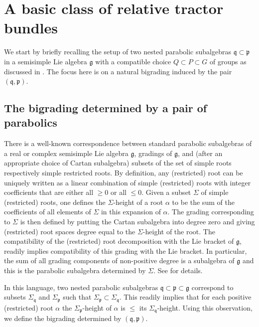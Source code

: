 \documentclass[10pt,a4paper]{amsart}
\numberwithin{equation}{section}
\def\frak{\mathfrak}
\newcommand{\al}{\alpha}
\newcommand{\Si}{\Sigma}
\begin{document}
\section{A basic class of relative tractor bundles}\label{2}

We start by briefly recalling the setup of two nested parabolic subalgebras $\frak
q\subset\frak p$ in a semisimple Lie algebra $\frak g$ with a compatible choice
$Q\subset P\subset G$ of groups as discussed in \cite{Rel-BGG1}. The focus here is on
a natural bigrading induced by the pair $(\frak q,\frak p)$.

\subsection{The bigrading determined by a pair of parabolics}\label{2.1}
There is a well-known correspondence between standard parabolic subalgebras of a real
or complex semisimple Lie algebra $\frak g$, gradings of $\frak g$, and (after an
appropriate choice of Cartan subalgebra) subsets of the set of simple roots
respectively simple restricted roots. By definition, any (restricted) root can be
uniquely written as a linear combination of simple (restricted) roots with integer
coefficients that are either all $\geq 0$ or all $\leq 0$. Given a subset $\Si$ of
simple (restricted) roots, one defines the $\Si$-height of a root $\al$ to be the sum
of the coefficients of all elements of $\Si$ in this expansion of $\al$. The grading
corresponding to $\Si$ is then defined by putting the Cartan subalgebra into degree
zero and giving (restricted) root spaces degree equal to the $\Si$-height of the
root. The compatibility of the (restricted) root decomposition with the Lie bracket
of $\frak g$, readily implies compatibility of this grading with the Lie bracket. In
particular, the sum of all grading components of non-positive degree is a subalgebra
of $\frak g$ and this is the parabolic subalgebra determined by $\Si$. See \cite[Sections
3.2.1 and 3.2.9]{book} for details.

In this language, two nested parabolic subalgebras $\frak q\subset\frak p\subset\frak
g$ correspond to subsets $\Si_{\frak q}$ and $\Si_{\frak p}$ such that $\Si_{\frak
 p}\subset\Si_{\frak q}$. This readily implies that for each positive (restricted)
root $\al$ the $\Si_{\frak p}$-height of $\al$ is $\leq$ its $\Si_{\frak
 q}$-height. Using this observation, we define the bigrading determined by $(\frak
q,\frak p)$.
\end{document}
